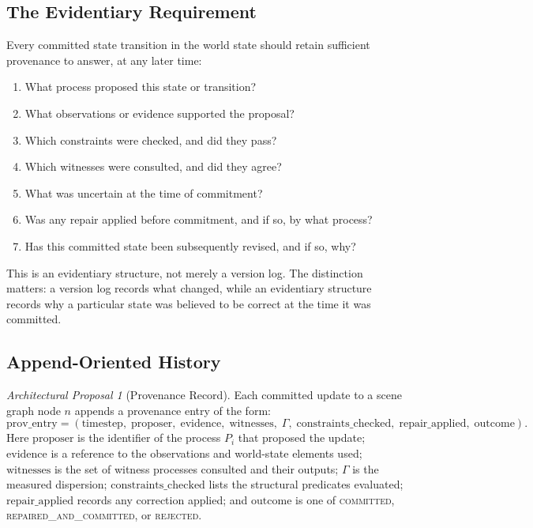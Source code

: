 \documentclass[12pt,a4paper]{article}
\theoremstyle{plain}
\theoremstyle{definition}
\theoremstyle{remark}
\newtheorem{proposal}[theorem]{Architectural Proposal}
\begin{document}
\subsection{The Evidentiary Requirement}

Every committed state transition in the world state should retain sufficient provenance to answer, at any later time:

\begin{enumerate}[leftmargin=2em,itemsep=0pt]
\item What process proposed this state or transition?
\item What observations or evidence supported the proposal?
\item Which constraints were checked, and did they pass?
\item Which witnesses were consulted, and did they agree?
\item What was uncertain at the time of commitment?
\item Was any repair applied before commitment, and if so, by what process?
\item Has this committed state been subsequently revised, and if so, why?
\end{enumerate}

This is an evidentiary structure, not merely a version log. The distinction matters: a version log records what changed, while an evidentiary structure records why a particular state was believed to be correct at the time it was committed.

\subsection{Append-Oriented History}

\begin{proposal}[Provenance Record]
Each committed update to a scene graph node $n$ appends a provenance entry of the form:
\[
\mathrm{prov\_entry} = (\mathrm{timestep},\; \mathrm{proposer},\; \mathrm{evidence},\; \mathrm{witnesses},\; \Gamma,\; \mathrm{constraints\_checked},\; \mathrm{repair\_applied},\; \mathrm{outcome}).
\]
Here $\mathrm{proposer}$ is the identifier of the process $P_i$ that proposed the update; $\mathrm{evidence}$ is a reference to the observations and world-state elements used; $\mathrm{witnesses}$ is the set of witness processes consulted and their outputs; $\Gamma$ is the measured dispersion; $\mathrm{constraints\_checked}$ lists the structural predicates evaluated; $\mathrm{repair\_applied}$ records any correction applied; and $\mathrm{outcome}$ is one of \textsc{committed}, \textsc{repaired\_and\_committed}, or \textsc{rejected}.
\end{proposal}
\end{document}
